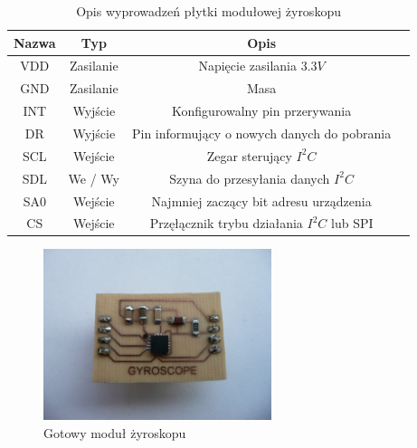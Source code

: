 \begin{table}[hb]
  \centering
  \caption{Opis wyprowadzeń płytki modułowej żyroskopu}
  \begin{tabular}{ | c | c | c | p{1.75cm} |} \hline
    Nazwa & Typ & Opis \\ \hline
    VDD & Zasilanie & Napięcie zasilania $3.3V$ \\
    GND & Zasilanie & Masa \\
    INT & Wyjście & Konfigurowalny pin przerywania \\
    DR  & Wyjście & Pin informujący o nowych danych do pobrania \\
    SCL & Wejście & Zegar sterujący $I^{2}C$ \\
    SDL & We / Wy & Szyna do przesyłania danych $I^{2}C$ \\
    SA0 & Wejście & Najmniej zaczący bit adresu urządzenia \\
    CS  & Wejście & Przęłącznik trybu działania $I^{2}C$ lub SPI \\ \hline
  \end{tabular}
  \label{tab:L3G4200DModOut}
\end{table}

\begin{figure}[!ht]
 \centering
 \includegraphics[height=50mm]{../images/ch04/gyromodule.jpg}
 \caption{Gotowy moduł żyroskopu}
 \label{fig:L3G4200DModule}
\end{figure}